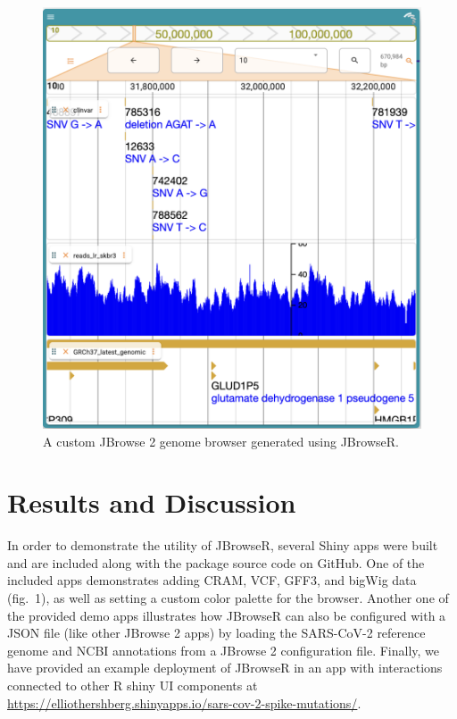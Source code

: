 \documentclass{bioinfo}
\begin{document}
\begin{figure}
\includegraphics[width=1\linewidth]{JBrowseR-paper-fig1} \caption{A custom JBrowse 2 genome browser generated using JBrowseR.}\label{fig:unnamed-chunk-1}
\end{figure}

\section{Results and Discussion}

In order to demonstrate the utility of JBrowseR, several Shiny apps were
built and are included along with the package source code on GitHub. One
of the included apps demonstrates adding CRAM, VCF, GFF3, and bigWig
data (fig.~1), as well as setting a custom color palette for the
browser. Another one of the provided demo apps illustrates how JBrowseR
can also be configured with a JSON file (like other JBrowse 2 apps) by
loading the SARS-CoV-2 reference genome and NCBI annotations from a
JBrowse 2 configuration file. Finally, we have provided an example
deployment of JBrowseR in an app with interactions connected to other R
shiny UI components at
\href{https://elliothershberg.shinyapps.io/sars-cov-2-spike-mutations/}{https://elliothershberg.shinyapps.io/sars-cov-2-spike-mutations/}.
\end{document}
